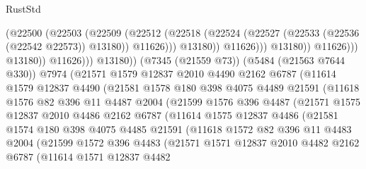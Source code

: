 \begin{lexlean}{RustStd}
\begin{coremodule}
{\begin{coremodule}
{{{{{{{{{{{{{{{{{{{{{{{{{{{{{{{                                    (@22500
                                      (@22503
                                        (@22509
                                          (@22512
                                            (@22518
                                              (@22524
                                                (@22527 (@22533 (@22536 (@22542 @22573)) @13180))
                                                @11626)))
                                          @13180))
                                      @11626)))
                                @13180))
                            @11626)))
                      @13180))
                  @11626)))
            @13180))
        (@7345 (@21559 @73))
        (@5484 (@21563 @7644 @330))
        @7974
        (@21571
          @1579
          @12837
          @2010
          @4490
          @2162
          @6787
          (@11614
            @1579
            @12837
            @4490
            (@21581
              @1578
              @180
              @398
              @4075
              @4489
              @21591
              (@11618
                @1576
                @82
                @396
                @11
                @4487
                @2004
                (@21599
                  @1576
                  @396
                  @4487
                  (@21571
                    @1575
                    @12837
                    @2010
                    @4486
                    @2162
                    @6787
                    (@11614
                      @1575
                      @12837
                      @4486
                      (@21581
                        @1574
                        @180
                        @398
                        @4075
                        @4485
                        @21591
                        (@11618
                          @1572
                          @82
                          @396
                          @11
                          @4483
                          @2004
                          (@21599
                            @1572
                            @396
                            @4483
                            (@21571
                              @1571
                              @12837
                              @2010
                              @4482
                              @2162
                              @6787
                              (@11614
                                @1571
                                @12837
                                @4482
}}}}}}}}}}}}}}}}}}}}}}}}}}}}}}}
\end{coremodule}}
\end{coremodule}
\end{lexlean}
